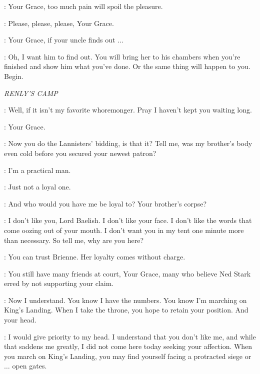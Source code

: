\ROS: Your Grace, too much pain will spoil the pleasure. 


\DAISY: Please, please, please, Your Grace. 

\ROS: Your Grace, if your uncle finds out $\ldots$  

\JOFFREY: Oh, I want him to find out. You will bring her to his chambers when you're finished and show him what you've done. Or the same thing will happen to you. Begin. 



\scene

\textit{RENLY'S CAMP} 


\RENLY: Well, if it isn't my favorite whoremonger. Pray I haven't kept you waiting long. 

\LITTLEFINGER: Your Grace. 

\RENLY: Now you do the Lannisters' bidding, is that it? Tell me, was my brother's body even cold before you secured your newest patron? 

\LITTLEFINGER: I'm a practical man. 

\RENLY: Just not a loyal one. 

\LITTLEFINGER: And who would you have me be loyal to? Your brother's corpse? 

\RENLY: I don't like you, Lord Baelish. I don't like your face. I don't like the words that come oozing out of your mouth. I don't want you in my tent one minute more than necessary. So tell me, why are you here? 


\RENLY: You can trust Brienne. Her loyalty comes without charge. 

\LITTLEFINGER: You still have many friends at court, Your Grace, many who believe Ned Stark erred by not supporting your claim. 

\RENLY: Now I understand. You know I have the numbers. You know I'm marching on King's Landing. When I take the throne, you hope to retain your position. And your head. 

\LITTLEFINGER: I would give priority to my head. I understand that you don't like me, and while that saddens me greatly, I did not come here today seeking your affection. When you march on King's Landing, you may find yourself facing a protracted siege or $\ldots$ open gates. 


